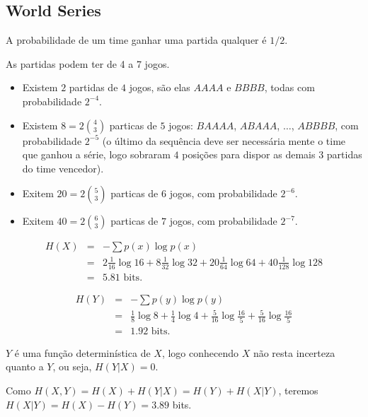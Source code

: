 \subsection{World Series}

\begin{questions}

\begin{solution}
  A probabilidade de um time ganhar uma partida qualquer é $1/2$.

  As partidas podem ter de 4 a 7 jogos. 

  \begin{itemize}
  \item Existem $2$ partidas de $4$ jogos, são elas $AAAA$ e $BBBB$, todas com probabilidade $2^{-4}$.
  \item Existem $8 = 2 {4 \choose 3}$ particas de $5$ jogos: $BAAAA$, $ABAAA$, $\ldots$, $ABBBB$, 
        com probabilidade $2^{-5}$ (o último da sequência deve ser necessária mente o time que 
        ganhou a série, logo sobraram $4$ posições para dispor as demais $3$ partidas do time vencedor).
  \item Exitem $20 = 2 {5 \choose 3}$ particas de $6$ jogos, com probabilidade $2^{-6}$.
  \item Exitem $40 = 2 {6 \choose 3}$ particas de $7$ jogos, com probabilidade $2^{-7}$.
  \end{itemize}

  \begin{eqnarray}
  H(X) &=& - \sum p(x) \log p(x) \nonumber \\
        &=& 2 \frac{1}{16} \log 16 + 8 \frac{1}{32} \log 32 + 20 \frac{1}{64} \log 64 + 40 \frac{1}{128} \log 128 \nonumber \\
        &=& 5.81 \text{ bits}.
  \end{eqnarray}

  \begin{eqnarray}
  H(Y) &=& - \sum p(y) \log p(y) \nonumber \\
        &=& \frac{1}{8} \log 8 + \frac{1}{4} \log 4 + \frac{5}{16} \log \frac{16}{5} + \frac{5}{16} \log \frac{16}{5} \nonumber \\
        &=& 1.92 \text{ bits}.
  \end{eqnarray}

  $Y$ é uma função determinística de $X$, logo conhecendo $X$ não resta incerteza quanto a $Y$, ou seja,
  $H(Y|X) = 0$.

  Como $H(X,Y) = H(X) + H(Y|X) = H(Y) + H(X|Y)$, teremos $H(X|Y) = H(X) - H(Y) = 3.89$ bits.

\end{solution}
\end{questions} 
